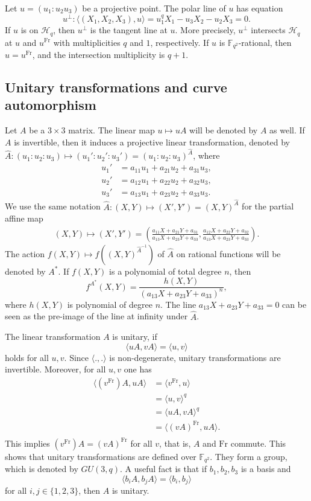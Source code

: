 \documentclass[a4paper]{amsart}
\theoremstyle{plain}
\theoremstyle{definition}
\theoremstyle{remark}
\newcommand{\Frob}{\mathrm{Fr}}
\begin{document}
Let $u=(u_1:u_2u_3)$ be a projective point. The polar line of $u$ has equation
\[u^\perp: \langle (X_1,X_2,X_3), u \rangle = u_1^qX_1-u_3X_2-u_2X_3=0.\]
If $u$ is on $\mathscr{H}_q$, then $u^\perp$ is the tangent line at $u$. More precisely, $u^\perp$ intersects $\mathscr{H}_q$ at $u$ and $u^\Frob$ with multiplicities $q$ and $1$, respectively. If $u$ is $\mathbb{F}_{q^2}$-rational, then $u=u^\Frob$, and the intersection multiplicity is $q+1$. 

\subsection{Unitary transformations and curve automorphism}

Let $A$ be a $3\times 3$ matrix. The linear map $u\mapsto uA$ will be denoted by $A$ as well. If $A$ is invertible, then it induces a projective linear transformation, denoted by $\hat{A}:(u_1:u_2:u_3)\mapsto (u_1':u_2':u_3')=(u_1:u_2:u_3)^{\hat{A}}$, where
\begin{align*} %
u_1' &= a_{11}u_1+a_{21}u_2+a_{31}u_3, \\
u_2' &= a_{12}u_1+a_{22}u_2+a_{32}u_3, \\
u_3' &= a_{13}u_1+a_{23}u_2+a_{33}u_3. 
\end{align*}
We use the same notation $\hat{A}:(X,Y) \mapsto (X',Y')=(X,Y)^{\hat{A}}$ for the partial affine map
\begin{align*} %
(X,Y) \mapsto (X',Y') = \left(\frac{a_{11}X+a_{21}Y+a_{31}}{a_{13}X+a_{23}Y+a_{33}}, \frac{a_{12}X+a_{22}Y+a_{32}}{a_{13}X+a_{23}Y+a_{33}}\right).
\end{align*}
The action $f(X,Y) \mapsto f((X,Y)^{\hat{A}^{-1}})$ of $\hat{A}$ on rational functions will be denoted by $A^*$. If $f(X,Y)$ is a polynomial of total degree $n$, then
\[f^{A^*}(X,Y)=\frac{h(X,Y)}{(a_{13}X+a_{23}Y+a_{33})^n},\]
where $h(X,Y)$ is polynomial of degree $n$. The line $a_{13}X+a_{23}Y+a_{33}=0$ can be seen as the pre-image of  the line at infinity under $\hat{A}$. 

The linear transformation $A$ is unitary, if
\[\langle uA, vA \rangle = \langle u,v \rangle\]
holds for all $u,v$. Since $\langle .,. \rangle$ is non-degenerate, unitary transformations are invertible. Moreover, for all $u,v$ one has
\begin{align*}
\langle (v^\Frob)A, uA \rangle &= \langle v^\Frob,u \rangle \\
&= \langle u,v \rangle^q \\
&= \langle uA,vA \rangle^q \\
&= \langle (vA)^\Frob,uA \rangle. \\
\end{align*}
This implies $(v^\Frob)A = (vA)^\Frob$ for all $v$, that is, $A$ and $\Frob$ commute. This shows that unitary transformations are defined over $\mathbb{F}_{q^2}$. They form a group, which is denoted by $GU(3,q)$. A useful fact is that if $b_1,b_2,b_3$ is a basis and
\[\langle b_iA, b_jA \rangle = \langle b_i,b_j \rangle\]
for all $i,j\in \{1,2,3\}$, then $A$ is unitary. 
\end{document}
